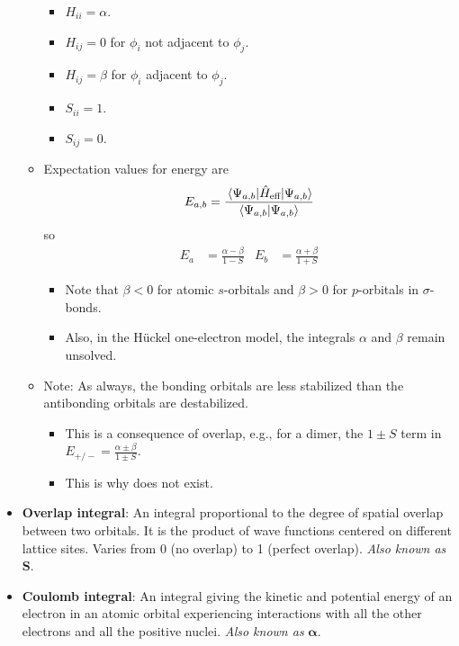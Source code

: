 \documentclass[../notes.tex]{subfiles}
\begin{document}
\begin{itemize}
\begin{itemize}
        \begin{itemize}
            \item $H_{ii}=\alpha$.
            \item $H_{ij}=0$ for $\phi_i$ not adjacent to $\phi_j$.
            \item $H_{ij}=\beta$ for $\phi_i$ adjacent to $\phi_j$.
            \item $S_{ii}=1$.
            \item $S_{ij}=0$.
        \end{itemize}
        \item Expectation values for energy are
        \begin{equation*}
            E_{a,b} = \frac{\ev{\hat{H}_\text{eff}}{\Psi_{a,b}}}{\bra{\Psi_{a,b}}\ket{\Psi_{a,b}}}
        \end{equation*}
        so
        \begin{align*}
            E_a &= \frac{\alpha-\beta}{1-S}&
                E_b &= \frac{\alpha+\beta}{1+S}
        \end{align*}
        \begin{itemize}
            \item Note that $\beta<0$ for atomic $s$-orbitals and $\beta>0$ for $p$-orbitals in $\sigma$-bonds.
            \item Also, in the H\"{u}ckel one-electron model, the integrals $\alpha$ and $\beta$ remain unsolved.
        \end{itemize}
        \item Note: As always, the bonding orbitals are less stabilized than the antibonding orbitals are destabilized.
        \begin{itemize}
            \item This is a consequence of overlap, e.g., for a dimer, the $1\pm S$ term in $E_{+/-}=\frac{\alpha\pm\beta}{1\pm S}$.
            \item This is why  does not exist.
        \end{itemize}
    \end{itemize}
    \item \textbf{Overlap integral}: An integral proportional to the degree of spatial overlap between two orbitals. It is the product of wave functions centered on different lattice sites. Varies from 0 (no overlap) to 1 (perfect overlap). \emph{Also known as} $\bm{S}$.
    \item \textbf{Coulomb integral}: An integral giving the kinetic and potential energy of an electron in an atomic orbital experiencing interactions with all the other electrons and all the positive nuclei. \emph{Also known as} $\bm{\alpha}$.

\end{itemize}
\end{document}
